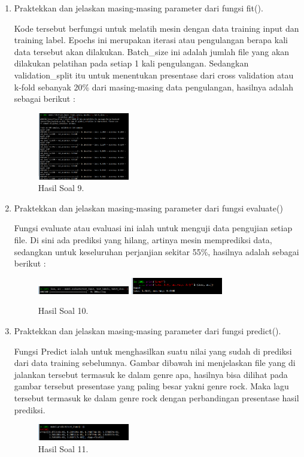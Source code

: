 \begin{enumerate}
	\item Praktekkan dan jelaskan masing-masing parameter dari fungsi ﬁt().
	\hfill\break
	
	Kode tersebut berfungsi untuk melatih mesin dengan data training input dan training label. Epochs ini merupakan iterasi atau pengulangan berapa kali data tersebut akan dilakukan. Batch\_size ini adalah jumlah file yang akan dilakukan pelatihan pada setiap 1 kali pengulangan. Sedangkan validation\_split itu untuk menentukan presentase dari cross validation atau k-fold sebanyak 20\% dari masing-masing data pengulangan, hasilnya adalah sebagai berikut :
	\begin{figure}[H]
	\centering
		\includegraphics[width=4cm]{figures/1174096/tugas6/hasil9.PNG}
		\caption{Hasil Soal 9.}
	\end{figure}

	\item Praktekkan dan jelaskan masing-masing parameter dari fungsi evaluate()
	\hfill\break
	
	Fungsi evaluate atau evaluasi ini ialah untuk menguji data pengujian setiap file. Di sini ada prediksi yang hilang, artinya mesin memprediksi data, sedangkan untuk keseluruhan perjanjian sekitar 55\%, hasilnya adalah sebagai berikut :
	\begin{figure}[H]
	\centering
		\includegraphics[width=4cm]{figures/1174096/tugas6/hasil10_1.PNG}
		\includegraphics[width=4cm]{figures/1174096/tugas6/hasil10_2.PNG}
		\caption{Hasil Soal 10.}
	\end{figure}

	\item Praktekkan dan jelaskan masing-masing parameter dari fungsi predict().
	\hfill\break
	
	Fungsi Predict ialah untuk menghasilkan suatu nilai yang sudah di prediksi dari data training sebelumnya. Gambar dibawah ini menjelaskan file yang di jalankan tersebut termasuk ke dalam genre apa, hasilnya bisa dilihat pada gambar tersebut presentase yang paling besar yakni genre rock. Maka lagu tersebut termasuk ke dalam genre rock dengan perbandingan presentase hasil prediksi.
	\begin{figure}[H]
	\centering
		\includegraphics[width=4cm]{figures/1174096/tugas6/hasil11.PNG}
		\caption{Hasil Soal 11.}
	\end{figure}
\end{enumerate}

